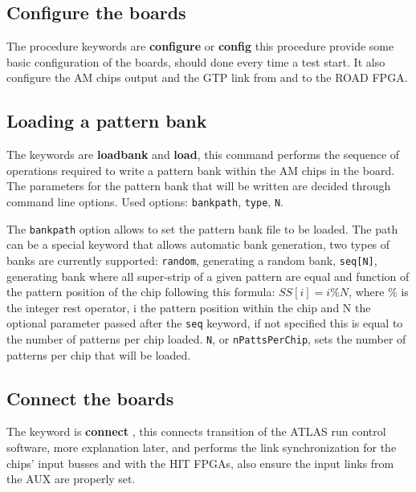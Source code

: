\subsection{Configure the boards}
\label{sec:procconfigure}

The procedure keywords are \textbf{configure} or \textbf{config}  this procedure provide some basic configuration of the boards, should done every time a test start. It
    also configure the AM chips output and the GTP link from and to the
    ROAD FPGA.

\subsection{Loading a pattern bank}
\label{sec:procloadbank}
The keywords are \textbf{loadbank} 
and \textbf{load}, 
this command performs the
	sequence of operations required to write a pattern bank within
	the AM chips in the board. The parameters for the pattern bank 
	that will be written are decided through command line options.
	Used options: \texttt{bankpath}, \texttt{type}, \texttt{N}.
    
    The \texttt{bankpath} option allows to set the pattern bank
    file to be loaded. The path can be a special keyword that
    allows automatic bank generation, two types of banks are
    currently supported: \texttt{random}, generating a random bank,
    \texttt{seq[N]}, generating bank where all super-strip of
    a given pattern are equal and function of the pattern position
    of the chip following this formula: $SS[i] = i\%N$, where \% is
    the integer rest operator, i the pattern position within the chip
    and N the optional parameter passed after the \texttt{seq}
    keyword, if not specified this is equal to the number of patterns
    per chip loaded. \texttt{N}, or \texttt{nPattsPerChip}, sets
    the number of patterns per chip that will be loaded.

\subsection{Connect the boards}
\label{sec:procconnect}

The keyword is	\textbf{connect} , this connects transition
	of the ATLAS run control software, more explanation later, and
	performs the link synchronization for the chips' input busses and
	with the HIT FPGAs, also ensure the input links from the AUX
	are properly set.
    
